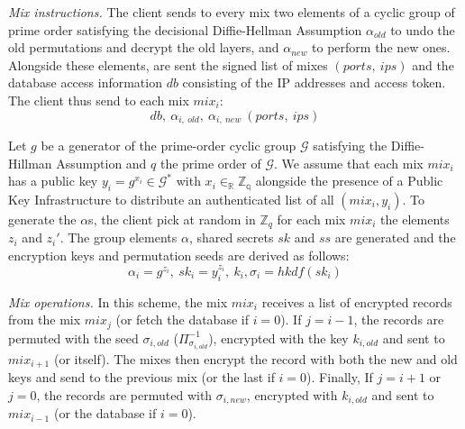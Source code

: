 \documentclass[USenglish,oneside,twocolumn]{article}
\begin{document}
%
\noindent\textit{Mix instructions.}
The client sends to every mix two elements of a cyclic group of prime order satisfying the decisional Diffie-Hellman Assumption $\alpha_{old}$ to undo the old permutations and decrypt the old layers, and $\alpha_{new}$ to perform the new ones. Alongside these elements, are sent the signed list of mixes $(ports,\ ips)$ and the database access information $db$ consisting of the IP addresses and access token. The client thus send to each mix $mix_i$:
$$ db,\ \alpha_{i,\ old},\ \alpha_{i,\ new}\ (ports,\ ips) $$

Let $g$ be a generator of the prime-order cyclic group $\mathcal{G}$ satisfying the Diffie-Hillman Assumption and $q$ the prime order of $\mathcal{G}$. We assume that each mix $mix_i$ has a public key $y_i=g^{x_i}\in \mathcal{G}^*$ with $x_i \in_{\mathbb{R}} \mathbb{Z_q}$ alongside the presence of a Public Key Infrastructure to distribute an authenticated list of all $(mix_i, y_i)$.
To generate the $\alpha$s, the client pick at random in $\mathbb{Z}_q$ for each mix $mix_i$ the elements $z_i$ and $z_i'$. The group elements $\alpha$, shared secrets $sk$ and $ss$ are generated and the encryption keys and permutation seeds are derived as follows: $$\alpha_i = g^{z_i},\ sk_i = y_i^{z_i},\ k_i, \sigma_i=hkdf(sk_i)$$


\noindent\textit{Mix operations.} In this scheme, the mix $mix_i$ receives a list of encrypted records from the mix $mix_j$ (or fetch the database if $i=0$). If $j=i-1$, the records are permuted with the seed $\sigma_{i,old}$ ($\Pi_{\sigma_{i,old}}^{-1}$), encrypted with the key $k_{i,old}$ and sent to $mix_{i+1}$ (or itself). The mixes then encrypt the record with both the new and old keys and send to the previous mix (or the last if $i=0$). Finally, If $j=i+1$ or $j=0$, the records are permuted with $\sigma_{i,new}$, encrypted with $k_{i,old}$ and sent to $mix_{i-1}$ (or the database if $i=0$).\\
\end{document}
